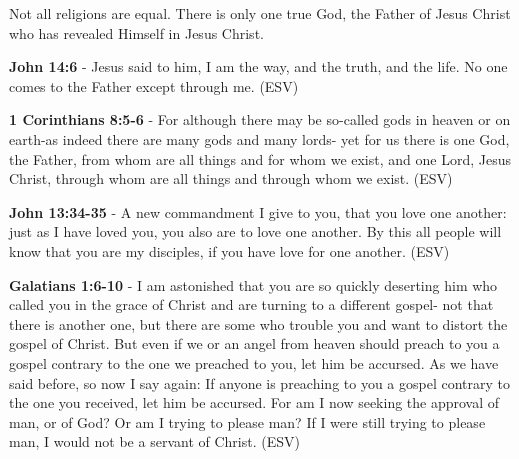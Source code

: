 \documentclass[11pt]{article}
\begin{document}
Not all religions are equal. There is only one true God, the Father of Jesus Christ who has revealed Himself in Jesus Christ.

\textbf{John 14:6} - Jesus said to him, I am the way, and the truth, and the life. No one comes to the Father except through me. (ESV)

\textbf{1 Corinthians 8:5-6} - For although there may be so-called gods in heaven or on earth-as indeed there are many gods and many lords- yet for us there is one God, the Father, from whom are all things and for whom we exist, and one Lord, Jesus Christ, through whom are all things and through whom we exist. (ESV)

\textbf{John 13:34-35} - A new commandment I give to you, that you love one another: just as I have loved you, you also are to love one another. By this all people will know that you are my disciples, if you have love for one another. (ESV)

\textbf{Galatians 1:6-10} - I am astonished that you are so quickly deserting him who called you in the grace of Christ and are turning to a different gospel- not that there is another one, but there are some who trouble you and want to distort the gospel of Christ. But even if we or an angel from heaven should preach to you a gospel contrary to the one we preached to you, let him be accursed. As we have said before, so now I say again: If anyone is preaching to you a gospel contrary to the one you received, let him be accursed. For am I now seeking the approval of man, or of God? Or am I trying to please man? If I were still trying to please man, I would not be a servant of Christ. (ESV)
\end{document}
